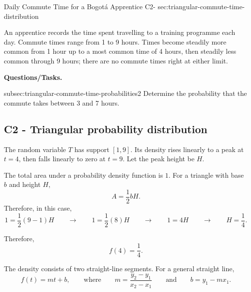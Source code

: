 	\sectionScored
	{Daily Commute Time for a Bogotá Apprentice}
	{C2-}
	{sec:triangular-commute-time-distribution}
	{
		An apprentice records the time spent travelling to a training programme each day. Commute times range from 1 to 9 hours. Times become steadily more common from 1 hour up to a most common time of 4 hours, then
		steadily less common through 9 hours; there are no commute times right at either limit.
		
		\textbf{Questions/Tasks.}
		\begin{enumerate}
			\CriterionTask
			{subsec:triangular-commute-time-probabilities}{2}
			{Determine the probability that the commute takes between 3 and 7 hours. }
		\end{enumerate}
		
		\label{subsec:triangular-commute-time-probabilities}
		\subsection*{C2 - Triangular probability distribution }
		
		The random variable \(T\) has support \([1,9]\). Its density rises
		linearly to a peak at \(t=4\), then falls linearly to zero at \(t=9\).
		Let the peak height be \(H\).
		
		
		The total area under a probability density function is \(1\).
		For a triangle with base \(b\) and height \(H\),
		\[
		A=\frac12 bH.
		\]
		Therefore, in this case,
		\[
		1
		=
		\frac12(9-1)H
		\qquad \rightarrow \qquad
		1
		=
		\frac12(8)H
		\qquad \rightarrow \qquad
		1=4H
		\qquad \rightarrow \qquad
		H=\frac14.
		\]
		
		Therefore,
		\[
		f(4)=\frac14.
		\]
		
		
		The density consists of two straight-line segments. For a general straight line,
		\[
		f(t)=mt+b,
		\qquad
		\text{where}
		\qquad
		m=\frac{y_2-y_1}{x_2-x_1}
		\qquad\text{and}\qquad
		b=y_1-mx_1.
		\]
		
}
